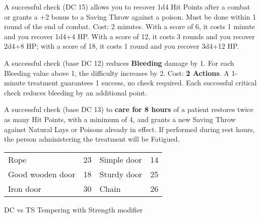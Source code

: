 \documentclass[landscape,10pt,a4paper]{article}
\begin{document}
\begin{multicols}{3}
\begin{dmbox}[title=First Aid - page \pageref{firstaid}]
A successful check (DC 15) allows you to recover 1d4 Hit Points after a combat or grants a +2 bonus to a Saving Throw against a poison. Must be done within 1 round of the end of combat. Cost: 2 minutes.
With a score of 6, it costs 1 minute and you recover 1d4+4 HP. With a score of 12, it costs 3 rounds and you recover 2d4+8 HP; with a score of 18, it costs 1 round and you recover 3d4+12 HP.

A successful check (base DC 12) reduces \textbf{Bleeding} damage by 1. For each Bleeding value above 1, the difficulty increases by 2. Cost: \textbf{2 Actions}.
A 1-minute treatment guarantees 1 success, no check required. Each successful critical check reduces bleeding by an additional point.

A successful check (base DC 13) to \textbf{care for 8 hours} of a patient restores twice as many Hit Points, with a minimum of 4, and grants a new Saving Throw against Natural Lays or Poisons already in effect.
If performed during rest hours, the person administering the treatment will be Fatigued.
\end{dmbox}

\begin{dmbox}[title=Breaking Objects - DC Strenght]
\begin{tabular}{ll|ll}
Rope & 23&Simple door & 14\\
Good wooden door & 18&Sturdy door & 25\\
Iron door & 30&Chain & 26 \\
\end{tabular}
\end{dmbox}


\begin{dmbox}[title=Breaking Down Doors - page \pageref{tabellaporte}]
\noindent    {}
DC vs TS Tempering with Strength modifier
\end{dmbox}





\end{multicols}
\end{document}

